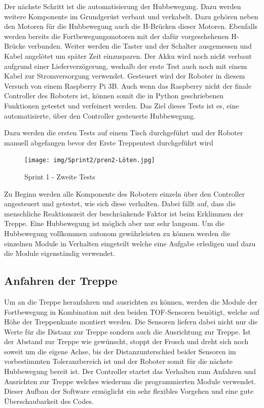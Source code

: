 Der nächste Schritt ist die automatisierung der Hubbewegung. Dazu werden weitere Komponente im Grundgerüst verbaut und verkabelt. Dazu gehören neben den Motoren für die Hubbewegung auch die H-Brücken dieser Motoren. Ebenfalls werden bereits die Fortbewegungsmotoren mit der dafür vorgesehehenen H-Brücke verbunden. Weiter werden die Taster und der Schalter ausgemessen und Kabel angelötet um später Zeit einzusparen. Der Akku wird noch nicht verbaut aufgrund einer Lieferverzögerung, weshalb der erste Test auch noch mit einem Kabel zur Stromversorgung verwendet. Gesteuert wird der Roboter in diesem Versuch von einem Raspberry Pi 3B.
Auch wenn das Raspberry nicht der finale Controller des Roboters ist, können somit die in Python geschriebenen Funktionen getestet und verfeinert werden.
Das Ziel dieses Tests ist es, eine automatisierte, über den Controller gesteuerte Hubbewegung.

Dazu werden die ersten Tests auf einem Tisch durchgeführt und der Roboter manuell abgefangen bevor der Erste Treppentest durchgeführt wird

\begin{figure}[H]
  \texttt{[image: img/Sprint2/pren2-Löten.jpg]}
  \centering
  \caption{Sprint 1 - Zweite Tests}
  \label{fig:sprint-backlog-1}
\end{figure}

Zu Beginn werden alle Komponente des Roboters einzeln über den Controller angesteuert und getestet, wie sich diese verhalten. Dabei fällt auf, dass die menschliche Reaktionszeit der beschränkende Faktor ist beim Erklimmen der Treppe. Eine Hubbewegung ist möglich aber nur sehr langsam. Um die Hubbewegung vollkommen autonom gewährleisten zu können werden die einzelnen Module in Verhalten eingeteilt welche eine Aufgabe erledigen und dazu die Module eigenständig verwendet.



\subsection{Anfahren der Treppe}

Um an die Treppe heranfahren und ausrichten zu können, werden die Module der Fortbewegung in Kombination mit den beiden TOF-Sensoren benötigt, welche auf Höhe der Treppenkante montiert werden. Die Sensoren liefern dabei nicht nur die Werte für die Distanz zur Treppe sondern auch die Ausrichtung zur Treppe. Ist der Abstand zur Treppe wie gewünscht, stoppt der Frosch und dreht sich noch soweit um die eigene Achse, bis der Distanzunterschied beider Sensoren im vorbestimmten Toleranzbereich ist und der Roboter somit für die nächste Hubbewegung bereit ist.
Der Controller startet das Verhalten zum Anfahren und Ausrichten zur Treppe welches wiederum die programmierten Module verwendet. Dieser Aufbau der Software ermöglicht ein sehr flexibles Vorgehen und eine gute Überschaubarkeit des Codes.

